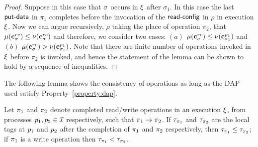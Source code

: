 \begin{proof}
 Suppose 
in this case that $\sigma$ occurs in $\EX$ after $\sigma_1$. In this case the 
   last $\act{put-data}$ in $\pi_1$ completes   before the invocation of the  $\act{read-config}$ in $\rho$ in execution $\EX$. 
   Now we can argue recursively, $\rho$ taking the place of operation $\pi_2$,  that $\mu(\mathbf{c}^{rc}_{{\sigma}}) \leq \nu(\mathbf{c}^{rc}_{{\sigma}})$ and 
therefore,  we consider  two cases:
$(a)$ $\mu(\mathbf{c}^{rc}_{\sigma}) \leq \nu(\mathbf{c}^{p_1}_{{\sigma}_1})$ and 
$(b)$ $\mu(\mathbf{c}^{rc}_{\sigma}) > \nu(\mathbf{c}^{p_1}_{{\sigma}_1})$. 
Note that there are finite number of operations  invoked in $\EX$  before $\pi_2$ is invoked, and hence  the statement of the lemma can be shown to hold by a sequence of inequalities.
\end{proof}

The following lemma shows the consistency of operations as long as the DAP used satisfy 
Property~\ref{property:dap}. %

\begin{lemma} %
	 Let $\pi_1$ and $\pi_2$ denote completed read/write operations in an execution $\EX$, from processes $p_1,p_2\in\mathcal{I}$ respectively, such that $\pi_1\rightarrow\pi_2$. If $\tau_{\pi_1}$ and $\tau_{\pi_2}$ are the 
	local tags at $p_1$ and $p_2$ after the completion of $\pi_1$ and $\pi_2$ respectively, then $\tau_{\pi_1} \leq \tau_{\pi_2}$; if $\pi_1$ is a write operation then $\tau_{\pi_1}  < \tau_{\pi_2}$.
\end{lemma}

